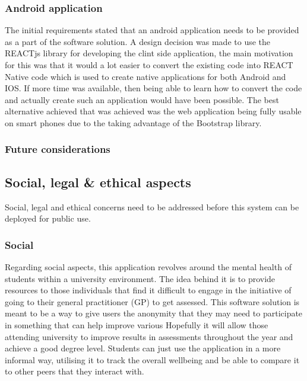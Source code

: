 \subsubsection*{Android application}
The initial requirements stated that an android application needs to be provided as a part of the software solution.
A design decision was made to use the REACTjs library for developing the clint side application, the main motivation for this was that it would a 
lot easier to convert the existing code into REACT Native code which is used to create native applications for both Android and IOS.
If more time was available, then being able to learn how to convert the code and actually create such an application would have been possible.
The best alternative achieved that was achieved was the web application being fully usable on smart phones due to the taking advantage of
the Bootstrap library.


\subsubsection{Future considerations}



\subsection{Social, legal \& ethical aspects}
Social, legal and ethical concerns need to be addressed before this system can be deployed for public use.

\subsubsection{Social}

Regarding social aspects, this application revolves around the mental health of students within a university environment.
The idea behind it is to provide resources to those individuals that find it difficult to engage in the initiative of going to their general practitioner
(GP) to get assessed.
This software solution is meant to be a way to give users the anonymity that they may need to participate in something that can help improve 
various 
Hopefully it will allow those attending university to improve results in assessments throughout the year and achieve a good degree level.
Students can just use the application in a more informal way, utilising it to track the overall wellbeing and be able to compare it to other peers that
they interact with.


